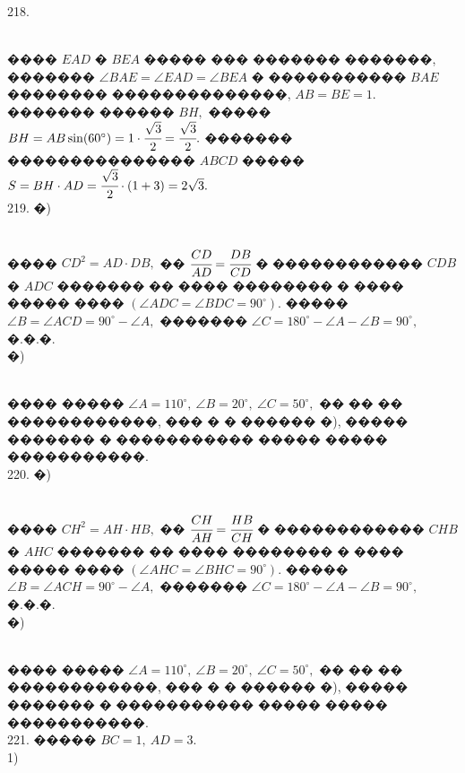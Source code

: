 \documentclass[12pt]{article}
\begin{document}
218. \begin{figure}[ht!]
\end{figure}\\
���� $EAD$ � $BEA$ ����� ��� ������� �������, ������� $\angle BAE=\angle EAD=\angle BEA$ � ����������� $BAE$ �������� ��������������, $AB=BE=1.$ ������� ������ $BH,$ ����� $BH=AB\sin(60^\circ)=1\cdot\cfrac{\sqrt{3}}{2}=\cfrac{\sqrt{3}}{2}.$ ������� ��������������� $ABCD$ ����� $S=BH\cdot AD=\cfrac{\sqrt{3}}{2}\cdot(1+3)=2\sqrt{3}.$\\
219. �)\begin{figure}[ht!]
\end{figure}\\
���� $CD^2=AD\cdot DB,$ �� $\cfrac{CD}{AD}=\cfrac{DB}{CD}$ � ������������ $CDB$ � $ADC$ ������� �� ���� �������� � ���� ����� ���� $(\angle ADC=\angle BDC=90^\circ).$ ����� $\angle B=\angle ACD=90^\circ-\angle A,$ ������� $\angle C=180^\circ-\angle A-\angle B=90^\circ,$ �.�.�.\\
�) \begin{figure}[ht!]
\end{figure}\\
���� ����� $\angle A=110^\circ,\ \angle B=20^\circ,\ \angle C=50^\circ,$ �� �� �� ������������, ��� � � ������ �), ����� ������� � ����������� ����� ����� �����������.\\
220. �)\begin{figure}[ht!]
\end{figure}\\
���� $CH^2=AH\cdot HB,$ �� $\cfrac{CH}{AH}=\cfrac{HB}{CH}$ � ������������ $CHB$ � $AHC$ ������� �� ���� �������� � ���� ����� ���� $(\angle AHC=\angle BHC=90^\circ).$ ����� $\angle B=\angle ACH=90^\circ-\angle A,$ ������� $\angle C=180^\circ-\angle A-\angle B=90^\circ,$ �.�.�.\\
�) \begin{figure}[ht!]
\end{figure}\\
���� ����� $\angle A=110^\circ,\ \angle B=20^\circ,\ \angle C=50^\circ,$ �� �� �� ������������, ��� � � ������ �), ����� ������� � ����������� ����� ����� �����������.\\
221. ����� $BC=1,\ AD=3.$\\
1) \begin{figure}[ht!]
\end{figure}\\
\end{document}
